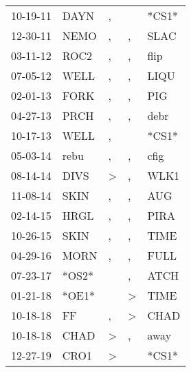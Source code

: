 \begin{supertabular}{lllll}
 10-19-11 &   DAYN &                , &                  &  *CS1* \\
 12-30-11 &   NEMO &                , &                , &   SLAC \\
 03-11-12 &   ROC2 &                , &                , &   flip \\
 07-05-12 &   WELL &                , &                , &   LIQU \\
 02-01-13 &   FORK &                , &                , &    PIG \\
 04-27-13 &   PRCH &                , &                , &   debr \\
 10-17-13 &   WELL &                , &                  &  *CS1* \\
 05-03-14 &   rebu &                , &                , &   cfig \\
 08-14-14 &   DIVS &     \textgreater &                , &   WLK1 \\
 11-08-14 &   SKIN &                , &                , &    AUG \\
 02-14-15 &   HRGL &                , &                , &   PIRA \\
 10-26-15 &   SKIN &                , &                , &   TIME \\
 04-29-16 &   MORN &                , &                , &   FULL \\
 07-23-17 &  *OS2* &                  &                , &   ATCH \\
 01-21-18 &  *OE1* &                  &     \textgreater &   TIME \\
 10-18-18 &     FF &                , &     \textgreater &   CHAD \\
 10-18-18 &   CHAD &     \textgreater &                , &   away \\
 12-27-19 &   CRO1 &     \textgreater &                  &  *CS1* \\
\end{supertabular}
